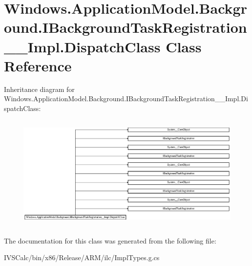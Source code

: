 \hypertarget{class_windows_1_1_application_model_1_1_background_1_1_i_background_task_registration_____impl_1_1_dispatch_class}{}\section{Windows.\+Application\+Model.\+Background.\+I\+Background\+Task\+Registration\+\_\+\+\_\+\+Impl.\+Dispatch\+Class Class Reference}
\label{class_windows_1_1_application_model_1_1_background_1_1_i_background_task_registration_____impl_1_1_dispatch_class}
Inheritance diagram for Windows.\+Application\+Model.\+Background.\+I\+Background\+Task\+Registration\+\_\+\+\_\+\+Impl.\+Dispatch\+Class\+:\begin{figure}[H]
\begin{center}
\leavevmode
\includegraphics[height=5.800377cm]{class_windows_1_1_application_model_1_1_background_1_1_i_background_task_registration_____impl_1_1_dispatch_class}
\end{center}
\end{figure}


The documentation for this class was generated from the following file\+:\begin{DoxyCompactItemize}
\item 
I\+V\+S\+Calc/bin/x86/\+Release/\+A\+R\+M/ilc/Impl\+Types.\+g.\+cs\end{DoxyCompactItemize}
